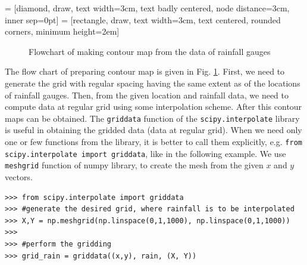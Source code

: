 \documentclass[10pt]{book}
\begin{document}
{%
 = [diamond, draw, text width=3cm, text badly centered, node distance=3cm, inner sep=0pt]
 = [rectangle, draw, text width=3cm, text centered, rounded corners, minimum height=2em]
\begin{figure}
 \begin{center}
  \caption{Flowchart of making contour map from the data of rainfall gauges}
  \label{fig:flowchart}
 \end{center}
\end{figure}

The flow chart of preparing contour map is given in Fig. \ref{fig:flowchart}. First, we need to generate the grid with regular spacing having the same extent as of the locations of rainfall gauges. Then, from the given location and rainfall data, we need to compute data at regular grid using some interpolation scheme. After this contour maps can be obtained. The \verb"griddata" function of the \verb"scipy.interpolate" library is useful in obtaining the gridded data (data at regular grid). When we need only one or few functions from the library, it is better to call them explicitly, e.g. \verb"from scipy.interpolate import griddata", like in the following example. We use \verb"meshgrid" function of numpy library, to create the mesh from the given $x$ and $y$ vectors. 

\beforeverb \begin{verbatim}
>>> from scipy.interpolate import griddata
>>> #generate the desired grid, where rainfall is to be interpolated
>>> X,Y = np.meshgrid(np.linspace(0,1,1000), np.linspace(0,1,1000))
>>> 
>>> #perform the gridding
>>> grid_rain = griddata((x,y), rain, (X, Y))
\end{verbatim} \afterverb
{}

}
\end{document}
